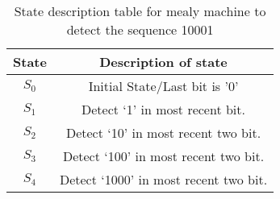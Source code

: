 \begin{table}[ht!]
    \centering
    \begin{tabular}{|c|c|}
    \hline
    State & Description of state                  \\ \hline
    $S_0$ & Initial State/Last bit is '0'         \\ \hline
    $S_1$ & Detect ‘1’ in most recent bit.        \\ \hline
    $S_2$ & Detect ‘10’ in most recent two bit.   \\ \hline
    $S_3$ & Detect ‘100’ in most recent two bit.  \\ \hline
    $S_4$ & Detect ‘1000’ in most recent two bit. \\ \hline
    \end{tabular}
    \caption{State description table for mealy machine to detect the sequence 10001}
    \end{table}\FloatBarrier